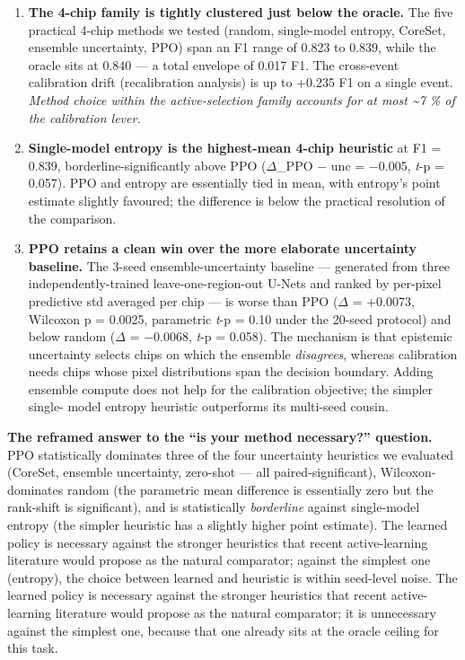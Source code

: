 \documentclass[sn-nature,lineno]{sn-jnl}
\providecommand{\tightlist}{\setlength{\itemsep}{0pt}\setlength{\parskip}{0pt}}
\theoremstyle{thmstyleone}
\theoremstyle{thmstyletwo}
\theoremstyle{thmstylethree}
\begin{document}
\begin{enumerate}
\def\labelenumi{\arabic{enumi}.}
\tightlist
\item
  \textbf{The 4-chip family is tightly clustered just below the oracle.}
  The five practical 4-chip methods we tested (random, single-model
  entropy, CoreSet, ensemble uncertainty, PPO) span an F1 range of
  0.823 to 0.839, while the oracle sits at 0.840 --- a total envelope
  of 0.017 F1. The cross-event calibration drift (recalibration analysis) is up to +0.235
  F1 on a single event. \emph{Method choice within the active-selection
  family accounts for at most \textasciitilde7 \% of the calibration lever.}
\item
  \textbf{Single-model entropy is the highest-mean 4-chip heuristic} at
  F1 = 0.839, borderline-significantly above PPO ($\Delta$\_PPO $-$ unc = $-$0.005,
  \emph{t}-p = 0.057). PPO and entropy are essentially tied in mean, with
  entropy's point estimate slightly favoured; the difference is below
  the practical resolution of the comparison.
\item
  \textbf{PPO retains a clean win over the more elaborate uncertainty
  baseline.} The 3-seed ensemble-uncertainty baseline --- generated
  from three independently-trained leave-one-region-out U-Nets and
  ranked by per-pixel predictive std averaged per chip --- is
  worse than PPO ($\Delta$ = +0.0073, Wilcoxon p = 0.0025, parametric
  \emph{t}-p = 0.10 under the 20-seed protocol) and below random
  ($\Delta$ = $-$0.0068, \emph{t}-p = 0.058). The
  mechanism is that epistemic uncertainty selects chips on which the
  ensemble \emph{disagrees}, whereas calibration needs chips whose pixel
  distributions span the decision boundary. Adding ensemble compute
  does not help for the calibration objective; the simpler single-
  model entropy heuristic outperforms its multi-seed cousin.
\end{enumerate}

\textbf{The reframed answer to the ``is your method necessary?'' question.}
PPO statistically dominates three of the four uncertainty heuristics we
evaluated (CoreSet, ensemble uncertainty, zero-shot --- all
paired-significant), Wilcoxon-dominates random (the parametric mean
difference is essentially zero but the rank-shift is significant), and
is statistically \emph{borderline} against single-model entropy (the simpler
heuristic has a slightly higher point estimate). The learned policy is
necessary against the stronger heuristics that recent active-learning
literature would propose as the natural comparator; against the simplest
one (entropy), the choice between learned and heuristic is within
seed-level noise.
The learned policy is necessary against the stronger heuristics that
recent active-learning literature would propose as the natural
comparator; it is unnecessary against the simplest one, because that one
already sits at the oracle ceiling for this task.
\end{document}

